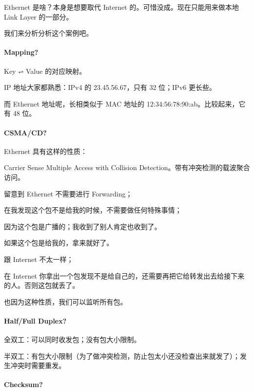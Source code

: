 \documentclass[
]{article}
\begin{document}
Ethernet 是啥？本身是想要取代 Internet 的。可惜没成。现在只能用来做本地
Link Layer 的一部分。

我们来分析分析这个案例吧。

\hypertarget{header-n91}{%
\paragraph{Mapping?}\label{header-n91}}

Key ⥋ Value 的对应映射。

IP 地址大家都熟悉：IPv4 的 23.45.56.67，只有 32 位；IPv6 更长些。

而 Ethernet 地址呢，长相类似于 MAC 地址的
12:34:56:78:90:ab。比较起来，它有 48 位。

\hypertarget{header-n95}{%
\paragraph{CSMA/CD?}\label{header-n95}}

Ethernet 具有这样的性质：

Carrier Sense Multiple Access with Collision
Detection。带有冲突检测的载波聚合访问。

留意到 Ethernet 不需要进行 Forwarding；

在我发现这个包不是给我的时候，不需要做任何特殊事情；

因为这个包是广播的；我收到了别人肯定也收到了。

如果这个包是给我的，拿来就好了。

跟 Internet 不太一样；

在 Internet
你拿出一个包发现不是给自己的，还需要再把它给转发出去给接下来的人。否则这包就丢了。

也因为这种性质，我们可以监听所有包。

\hypertarget{header-n105}{%
\paragraph{Half/Full Duplex?}\label{header-n105}}

全双工：可以同时收发包；没有包大小限制。

半双工：有包大小限制（为了做冲突检测，防止包太小还没检查出来就发了）；发生冲突时需要重发。

\hypertarget{header-n108}{%
\paragraph{Checksum?}\label{header-n108}}
\end{document}
